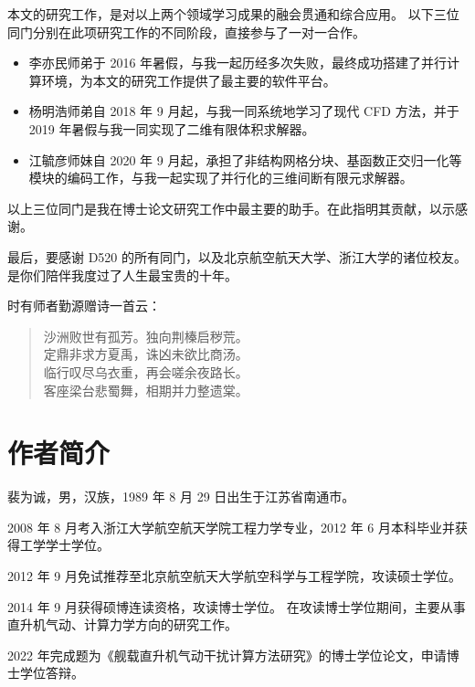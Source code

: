 \documentclass[doctor,openright,twoside,AutoFakeBold=true]{buaathesis}
\theoremstyle{plain}
\theoremstyle{definition}
\theoremstyle{plain}
\theoremstyle{plain}
\theoremstyle{remark}
\theoremstyle{remark}
\theoremstyle{definition}
\theoremstyle{plain}
\theoremstyle{definition}
\theoremstyle{plain}
\theoremstyle{plain}
\theoremstyle{remark}
\theoremstyle{plain}
\theoremstyle{definition}
\theoremstyle{remark}
\theoremstyle{plain}
\theoremstyle{remark}
\theoremstyle{definition}
\theoremstyle{plain}
\theoremstyle{plain}
\theoremstyle{definition}
\theoremstyle{plain}
\theoremstyle{plain}
\theoremstyle{definition}
\begin{document}
本文的研究工作，是对以上两个领域学习成果的融会贯通和综合应用。
以下三位同门分别在此项研究工作的不同阶段，直接参与了一对一合作。
\begin{itemize}
\item 李亦民师弟于 2016 年暑假，与我一起历经多次失败，最终成功搭建了并行计算环境，为本文的研究工作提供了最主要的软件平台。
\item 杨明浩师弟自 2018 年 9 月起，与我一同系统地学习了现代 CFD 方法，并于 2019 年暑假与我一同实现了二维有限体积求解器。
\item 江毓彦师妹自 2020 年 9 月起，承担了非结构网格分块、基函数正交归一化等模块的编码工作，与我一起实现了并行化的三维间断有限元求解器。
\end{itemize}
以上三位同门是我在博士论文研究工作中最主要的助手。在此指明其贡献，以示感谢。

最后，要感谢 D520 的所有同门，以及北京航空航天大学、浙江大学的诸位校友。
是你们陪伴我度过了人生最宝贵的十年。

时有师者勤源赠诗一首云：
\begin{quote}
\centering{}
沙洲败世有孤芳。独向荆榛启秽荒。\\
定鼎非求方夏禹，诛凶未欲比商汤。\\
临行叹尽乌衣重，再会嗟余夜路长。\\
客座梁台悲蜀舞，相期并力整遗棠。\\
\end{quote}

\chapter{作者简介}
裴为诚，男，汉族，1989 年 8 月 29 日出生于江苏省南通市。

2008 年 8 月考入浙江大学航空航天学院工程力学专业，2012 年 6 月本科毕业并获得工学学士学位。

2012 年 9 月免试推荐至北京航空航天大学航空科学与工程学院，攻读硕士学位。

2014 年 9 月获得硕博连读资格，攻读博士学位。
在攻读博士学位期间，主要从事直升机气动、计算力学方向的研究工作。

2022 年完成题为《舰载直升机气动干扰计算方法研究》的博士学位论文，申请博士学位答辩。
\end{document}
